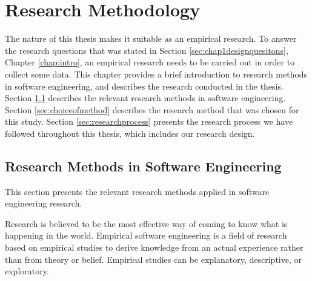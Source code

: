 
\chapter{Research Methodology}
\label{chap:researchmethod}



The nature of this thesis makes it suitable as an empirical research. To answer the research questions that was stated in Section \ref{sec:chap1designquesitons}, Chapter \ref{chap:intro}, an empirical research needs to be carried out in order to collect some data. This chapter provides a brief introduction to research methods in software engineering, and describes the research conducted in the thesis. Section \ref{sec:researchmethodsinsoftwareengineering} describes the relevant research methods in software engineering. Section \ref{sec:choiceofmethod} describes the research method that was chosen for this study. Section \ref{sec:researchprocess} presents the research process we have followed throughout this thesis, which includes our research design.





\section{Research Methods in Software Engineering}
\label{sec:researchmethodsinsoftwareengineering}
 This section presents the relevant research methods applied in software engineering research. 

Research is believed to be the most effective way of coming to know what is happening in the world\cite{bassey2003case}. Empirical software engineering is a field of research based on empirical studies to derive knowledge from an actual experience rather than from theory or belief\cite{empirical-research-SE}. Empirical studies can be explanatory, descriptive, or exploratory\cite{Wohlin:2000:ESE:330775}. 

